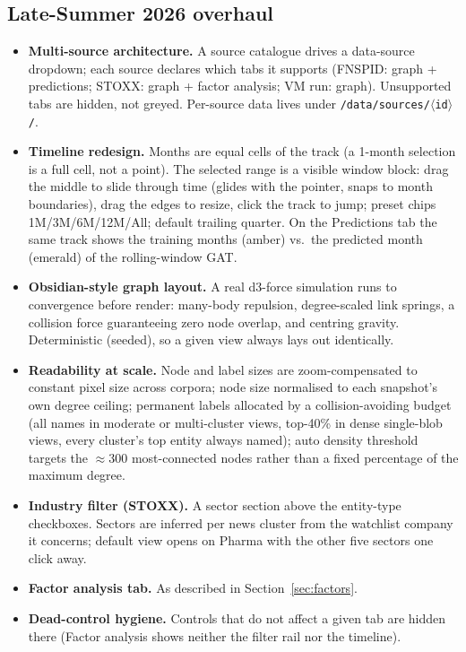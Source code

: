 \documentclass[11pt]{article}
\begin{document}
\subsection{Late-Summer 2026 overhaul}
\begin{itemize}
  \item \textbf{Multi-source architecture.} A source catalogue drives a data-source dropdown; each source declares which tabs it supports (FNSPID: graph + predictions; STOXX: graph + factor analysis; VM run: graph). Unsupported tabs are hidden, not greyed. Per-source data lives under \texttt{/data/sources/\(\langle\)id\(\rangle\)/}.
  \item \textbf{Timeline redesign.} Months are equal cells of the track (a 1-month selection is a full cell, not a point). The selected range is a visible window block: drag the middle to slide through time (glides with the pointer, snaps to month boundaries), drag the edges to resize, click the track to jump; preset chips 1M/3M/6M/12M/All; default trailing quarter. On the Predictions tab the same track shows the training months (amber) vs.\ the predicted month (emerald) of the rolling-window GAT.
  \item \textbf{Obsidian-style graph layout.} A real d3-force simulation runs to convergence before render: many-body repulsion, degree-scaled link springs, a collision force guaranteeing zero node overlap, and centring gravity. Deterministic (seeded), so a given view always lays out identically.
  \item \textbf{Readability at scale.} Node and label sizes are zoom-compensated to constant pixel size across corpora; node size normalised to each snapshot's own degree ceiling; permanent labels allocated by a collision-avoiding budget (all names in moderate or multi-cluster views, top-40\% in dense single-blob views, every cluster's top entity always named); auto density threshold targets the \(\approx\)300 most-connected nodes rather than a fixed percentage of the maximum degree.
  \item \textbf{Industry filter (STOXX).} A sector section above the entity-type checkboxes. Sectors are inferred per news cluster from the watchlist company it concerns; default view opens on Pharma with the other five sectors one click away.
  \item \textbf{Factor analysis tab.} As described in Section~\ref{sec:factors}.
  \item \textbf{Dead-control hygiene.} Controls that do not affect a given tab are hidden there (Factor analysis shows neither the filter rail nor the timeline).

\end{itemize}
\end{document}
